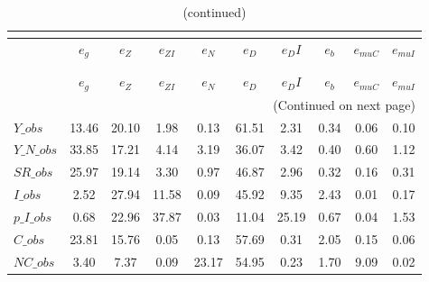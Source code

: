  
\begin{center}
\begin{longtable}{lccccccccc} 
\caption{VARIANCE DECOMPOSITION (in percent)}\\
 \label{Table:th_var_decomp_uncond}\\
\toprule 
$               $	 & 	 $        {e_g}$	 & 	 $        {e_Z}$	 & 	 $     {e_{ZI}}$	 & 	 $        {e_N}$	 & 	 $        {e_D}$	 & 	 $       {e_DI}$	 & 	 $        {e_b}$	 & 	 $    {e_{muC}}$	 & 	 $    {e_{muI}}$\\
\midrule \endfirsthead 
\caption{(continued)}\\
 \toprule \\ 
$               $	 & 	 $        {e_g}$	 & 	 $        {e_Z}$	 & 	 $     {e_{ZI}}$	 & 	 $        {e_N}$	 & 	 $        {e_D}$	 & 	 $       {e_DI}$	 & 	 $        {e_b}$	 & 	 $    {e_{muC}}$	 & 	 $    {e_{muI}}$\\
\midrule \endhead 
\midrule \multicolumn{10}{r}{(Continued on next page)} \\ \bottomrule \endfoot 
\bottomrule \endlastfoot 
$Y\_obs         $	 & 	        13.46	 & 	        20.10	 & 	         1.98	 & 	         0.13	 & 	        61.51	 & 	         2.31	 & 	         0.34	 & 	         0.06	 & 	         0.10 \\ 
$Y\_N\_obs      $	 & 	        33.85	 & 	        17.21	 & 	         4.14	 & 	         3.19	 & 	        36.07	 & 	         3.42	 & 	         0.40	 & 	         0.60	 & 	         1.12 \\ 
$SR\_obs        $	 & 	        25.97	 & 	        19.14	 & 	         3.30	 & 	         0.97	 & 	        46.87	 & 	         2.96	 & 	         0.32	 & 	         0.16	 & 	         0.31 \\ 
$I\_obs         $	 & 	         2.52	 & 	        27.94	 & 	        11.58	 & 	         0.09	 & 	        45.92	 & 	         9.35	 & 	         2.43	 & 	         0.01	 & 	         0.17 \\ 
$p\_I\_obs      $	 & 	         0.68	 & 	        22.96	 & 	        37.87	 & 	         0.03	 & 	        11.04	 & 	        25.19	 & 	         0.67	 & 	         0.04	 & 	         1.53 \\ 
$C\_obs         $	 & 	        23.81	 & 	        15.76	 & 	         0.05	 & 	         0.13	 & 	        57.69	 & 	         0.31	 & 	         2.05	 & 	         0.15	 & 	         0.06 \\ 
$NC\_obs        $	 & 	         3.40	 & 	         7.37	 & 	         0.09	 & 	        23.17	 & 	        54.95	 & 	         0.23	 & 	         1.70	 & 	         9.09	 & 	         0.02 \\ 

\end{longtable}
\end{center}
